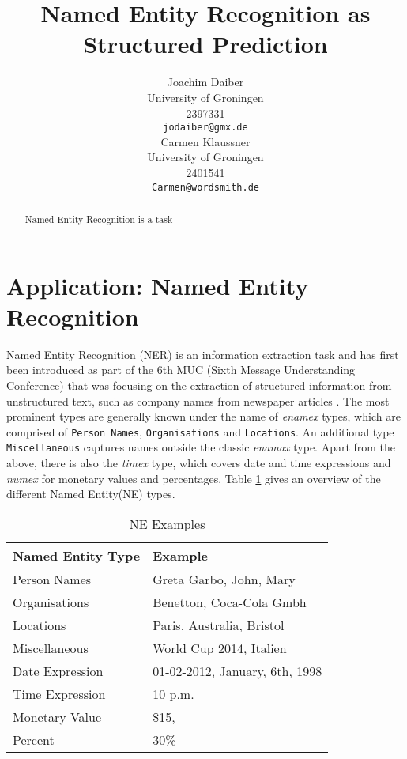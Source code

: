 \documentclass[11pt]{article}
\title{Named Entity Recognition as Structured Prediction}
\author{Joachim Daiber \\
  University of Groningen \\
  2397331\\
  {\tt jodaiber@gmx.de} \\\And
  Carmen Klaussner \\
  University of Groningen \\
  2401541\\
  {\tt Carmen@wordsmith.de} \\}
\date{}
\newcommand{\namedentity}{Named Entity}
\begin{document}
\maketitle

\begin{abstract}
Named Entity Recognition is a task

\end{abstract}


\section{Application: Named Entity Recognition}

Named Entity Recognition (NER) is an information extraction task and has first been introduced as part of the 6th MUC (Sixth Message Understanding Conference)
that was focusing on the extraction of structured information from unstructured text, such as company names from newspaper articles \cite{nadeau2007survey}.
The most prominent types are generally known under the name of \emph{enamex} types, which are comprised of \texttt{Person Names}, 
\texttt{Organisations} and \texttt{Locations}. 
An additional type \texttt{Miscellaneous} captures names outside the classic \emph{enamax} type.
Apart from the above, there is also the \emph{timex} type, which covers date and time expressions and \emph{numex} for monetary values and percentages. 
Table \ref{table:NETypes} gives an overview of the different \namedentity (NE) types.

\begin{table}[h!]
\scriptsize
\begin{tabular}{| l | l |}
\hline
\bf Named Entity Type & \bf Example \\
\hline
Person Names & Greta Garbo, John, Mary \\
Organisations& Benetton, Coca-Cola Gmbh\\
Locations&  Paris, Australia, Bristol\\
Miscellaneous& World Cup 2014, Italien\\
 Date Expression& 01-02-2012, January, 6th, 1998 \\
Time Expression & 10 p.m.\\
Monetary Value &  \$15, \textsterling 100    \\
Percent &   30\% \\
\hline
\end{tabular}
\caption{NE Examples}
\label{table:NETypes}
\end{table}
\end{document}
